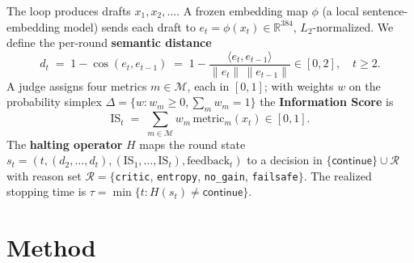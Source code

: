 \documentclass[conference]{IEEEtran}
\begin{document}
The loop produces drafts $x_1,x_2,\dots$. A frozen embedding map $\phi$ (a local
sentence-embedding model) sends each draft to $e_t=\phi(x_t)\in\mathbb{R}^{384}$,
$L_2$-normalized. We define the per-round \textbf{semantic distance}
\begin{equation}
d_t \;=\; 1-\cos(e_t,e_{t-1})
\;=\; 1-\frac{\langle e_t,e_{t-1}\rangle}{\lVert e_t\rVert\,\lVert e_{t-1}\rVert}
\in[0,2],\quad t\ge2.
\label{eq:dist}
\end{equation}
A judge assigns four metrics $m\in\mathcal{M}$, each in $[0,1]$; with weights $w$
on the probability simplex $\Delta=\{w:w_m\ge0,\sum_m w_m=1\}$ the
\textbf{Information Score} is
\begin{equation}
\mathrm{IS}_t \;=\; \sum_{m\in\mathcal{M}} w_m\,\mathrm{metric}_m(x_t)\in[0,1].
\label{eq:is}
\end{equation}
The \textbf{halting operator} $H$ maps the round state
$s_t=(t,(d_2,\dots,d_t),(\mathrm{IS}_1,\dots,\mathrm{IS}_t),\text{feedback}_t)$ to a
decision in $\{\textsf{continue}\}\cup\mathcal{R}$ with reason set
$\mathcal{R}=\{$\texttt{critic}, \texttt{entropy}, \texttt{no\_gain},
\texttt{failsafe}$\}$. The realized stopping time is
$\tau=\min\{t:H(s_t)\neq\textsf{continue}\}$.

\section{Method}\label{sec:method}
\end{document}
